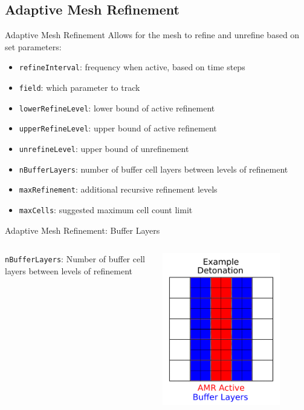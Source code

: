 \subsection{Adaptive Mesh Refinement}

\begin{frame}{Adaptive Mesh Refinement}
Allows for the mesh to refine and unrefine based on set parameters:
\begin{itemize}
\item \texttt{refineInterval}: frequency when active, based on time steps
\item \texttt{field}: which parameter to track
\item \texttt{lowerRefineLevel}: lower bound of active refinement 
\item \texttt{upperRefineLevel}: upper bound of active refinement
\item \texttt{unrefineLevel}: upper bound of unrefinement
\item \texttt{nBufferLayers}: number of buffer cell layers between levels of refinement 
\item \texttt{maxRefinement}: additional recursive refinement levels
\item \texttt{maxCells}: suggested maximum cell count limit
\end{itemize}
\end{frame}

\begin{frame}{Adaptive Mesh Refinement: Buffer Layers}
\begin{columns}
\texttt{nBufferLayers}: Number of buffer cell layers between levels of refinement
\begin{center}
\includegraphics[width=0.8\textwidth]{../figs/amr_buffer.png}
\end{center}
\end{columns}
\end{frame}


